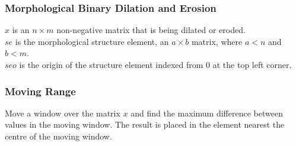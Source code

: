   \subsubsection{Morphological Binary Dilation and Erosion}
    \label{function-Dilation-and-Erosion}

  $x$ is an $n\times m$ non-negative matrix that is being dilated or eroded.
  \\
  $se$ is the morphological structure element, an $a\times b$ matrix, where $a<n$ and $b<m$.
  \\
  $seo$ is the origin of the structure element indexed from 0 at the top left corner.

\subsubsection{Moving Range}
    \label{function-Moving-Range}

  \par Move a window over the matrix 
  $x$ and find the maximum difference between values in the
  moving window. The result is placed in the element nearest the centre
  of the moving window.
